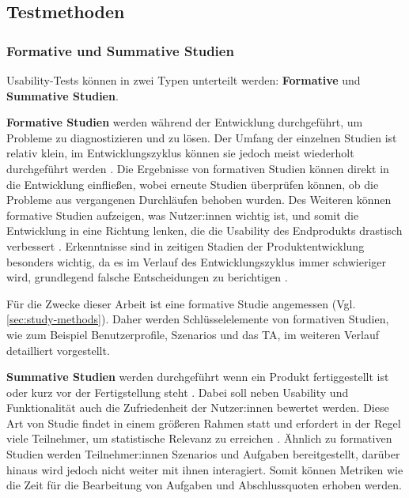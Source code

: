 \subsection{Testmethoden}
\subsubsection{Formative und Summative Studien}
\label{sec:formative-summative}
Usability-Tests können in zwei Typen unterteilt werden: \textbf{Formative} und \textbf{Summative
  Studien}.

\vspace{\baselineskip}

\textbf{Formative Studien} werden während der Entwicklung durchgeführt, um Probleme zu diagnostizieren und zu lösen. Der Umfang der einzelnen Studien ist relativ klein, im Entwicklungszyklus können sie jedoch meist wiederholt durchgeführt werden \parencite{barnumUsabilityTesting2021}. Die Ergebnisse von formativen Studien können direkt in die Entwicklung einfließen, wobei erneute Studien überprüfen können, ob die Probleme aus vergangenen Durchläufen behoben wurden. Des Weiteren können formative Studien aufzeigen, was Nutzer:innen wichtig ist, und somit die Entwicklung in eine Richtung lenken, die die Usability des Endprodukts drastisch verbessert \parencite{barnumUsabilityTesting2021}. Erkenntnisse sind in zeitigen Stadien der Produktentwicklung besonders wichtig, da es im Verlauf des Entwicklungszyklus immer schwieriger wird, grundlegend falsche Entscheidungen zu berichtigen \parencite{barnumUsabilityTesting2021}.

Für die Zwecke dieser Arbeit ist eine formative Studie angemessen (Vgl. \ref{sec:study-methods}). Daher werden Schlüsselelemente von formativen Studien, wie zum Beispiel Benutzerprofile, Szenarios und das \acl{TA}, im weiteren Verlauf detailliert vorgestellt.

\vspace{\baselineskip}

\textbf{Summative Studien} werden durchgeführt wenn ein Produkt fertiggestellt ist oder kurz vor der Fertigstellung steht \parencite{barnumUsabilityTesting2021}. Dabei soll neben Usability und Funktionalität auch die Zufriedenheit der Nutzer:innen bewertet werden. Diese Art von Studie findet in einem größeren Rahmen statt und erfordert in der Regel viele Teilnehmer, um statistische Relevanz zu erreichen \parencite{barnumUsabilityTesting2021}. Ähnlich zu formativen Studien werden Teilnehmer:innen Szenarios und Aufgaben bereitgestellt, darüber hinaus wird jedoch nicht weiter mit ihnen interagiert. Somit können Metriken wie die Zeit für die Bearbeitung von Aufgaben und Abschlussquoten erhoben werden.


